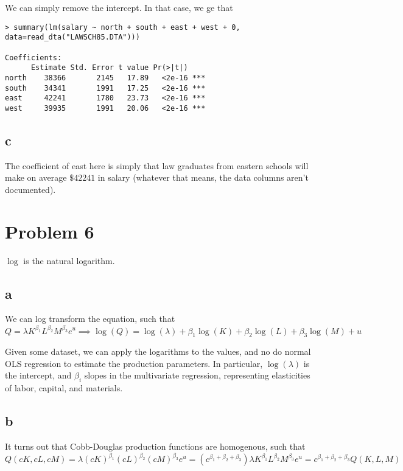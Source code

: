 \documentclass[12pt,letterpaper]{article}
\theoremstyle{definition}
\begin{document}
We can simply remove the intercept. In that case, we ge that
\begin{Verbatim}[fontsize=\small]
> summary(lm(salary ~ north + south + east + west + 0, data=read_dta("LAWSCH85.DTA")))

Coefficients:
      Estimate Std. Error t value Pr(>|t|)
north    38366       2145   17.89   <2e-16 ***
south    34341       1991   17.25   <2e-16 ***
east     42241       1780   23.73   <2e-16 ***
west     39935       1991   20.06   <2e-16 ***
\end{Verbatim}

\subsection*{c}

The coefficient of east here is simply that law graduates from eastern schools will make on average $\$42241$ in salary (whatever that means, the data columns aren't documented).

\section*{Problem 6}

$\log$ is the natural logarithm.

\subsection*{a}

We can log transform the equation, such that
\[
  Q = \lambda K^{\beta_{1}}L^{\beta_{2}}M^{\beta_{3}}e^{u} \implies \log(Q) = \log(\lambda) + \beta_{1}\log(K) + \beta_{2}\log(L) + \beta_{3}\log(M) + u
\]

Given some dataset, we can apply the logarithms to the values, and no do normal OLS regression to estimate the production parameters. In particular, $\log(\lambda)$ is the intercept, and $\beta_{i}$ slopes in the multivariate regression, representing elasticities of labor, capital, and materials.

\subsection*{b}

It turns out that Cobb-Douglas production functions are homogenous, such that
\[
  Q(cK,cL,cM) = \lambda (cK)^{\beta_{1}}(cL)^{\beta_{2}}(cM)^{\beta_{3}}e^{u} =  (c^{\beta_{1} + \beta_{2} + \beta_{3}})\lambda K^{\beta_{1}}L^{\beta_{2}}M^{\beta_{3}}e^{u} = c^{\beta_{1} + \beta_{2} + \beta_{3}} Q(K, L, M)
\]
\end{document}

